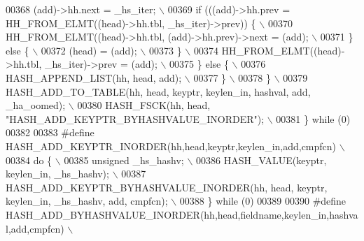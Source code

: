 \begin{DoxyCode}
{{{00368 \textcolor{preprocessor}{      (add)->hh.next = \_hs\_iter;                                                 \(\backslash\)}
00369 \textcolor{preprocessor}{      if (((add)->hh.prev = HH\_FROM\_ELMT((head)->hh.tbl, \_hs\_iter)->prev)) \{     \(\backslash\)}
00370 \textcolor{preprocessor}{        HH\_FROM\_ELMT((head)->hh.tbl, (add)->hh.prev)->next = (add);              \(\backslash\)}
00371 \textcolor{preprocessor}{      \} else \{                                                                   \(\backslash\)}
00372 \textcolor{preprocessor}{        (head) = (add);                                                          \(\backslash\)}
00373 \textcolor{preprocessor}{      \}                                                                          \(\backslash\)}
00374 \textcolor{preprocessor}{      HH\_FROM\_ELMT((head)->hh.tbl, \_hs\_iter)->prev = (add);                      \(\backslash\)}
00375 \textcolor{preprocessor}{    \} else \{                                                                     \(\backslash\)}
00376 \textcolor{preprocessor}{      HASH\_APPEND\_LIST(hh, head, add);                                           \(\backslash\)}
00377 \textcolor{preprocessor}{    \}                                                                            \(\backslash\)}
00378 \textcolor{preprocessor}{  \}                                                                              \(\backslash\)}
00379 \textcolor{preprocessor}{  HASH\_ADD\_TO\_TABLE(hh, head, keyptr, keylen\_in, hashval, add, \_ha\_oomed);       \(\backslash\)}
00380 \textcolor{preprocessor}{  HASH\_FSCK(hh, head, "HASH\_ADD\_KEYPTR\_BYHASHVALUE\_INORDER");                    \(\backslash\)}
00381 \textcolor{preprocessor}{\} while (0)}
00382 
00383 \textcolor{preprocessor}{#define HASH\_ADD\_KEYPTR\_INORDER(hh,head,keyptr,keylen\_in,add,cmpfcn)             \(\backslash\)}
00384 \textcolor{preprocessor}{do \{                                                                             \(\backslash\)}
00385 \textcolor{preprocessor}{  unsigned \_hs\_hashv;                                                            \(\backslash\)}
00386 \textcolor{preprocessor}{  HASH\_VALUE(keyptr, keylen\_in, \_hs\_hashv);                                      \(\backslash\)}
00387 \textcolor{preprocessor}{  HASH\_ADD\_KEYPTR\_BYHASHVALUE\_INORDER(hh, head, keyptr, keylen\_in, \_hs\_hashv, add, cmpfcn); \(\backslash\)}
00388 \textcolor{preprocessor}{\} while (0)}
00389 
00390 \textcolor{preprocessor}{#define HASH\_ADD\_BYHASHVALUE\_INORDER(hh,head,fieldname,keylen\_in,hashval,add,cmpfcn) \(\backslash\)}
}}}
\end{DoxyCode}
